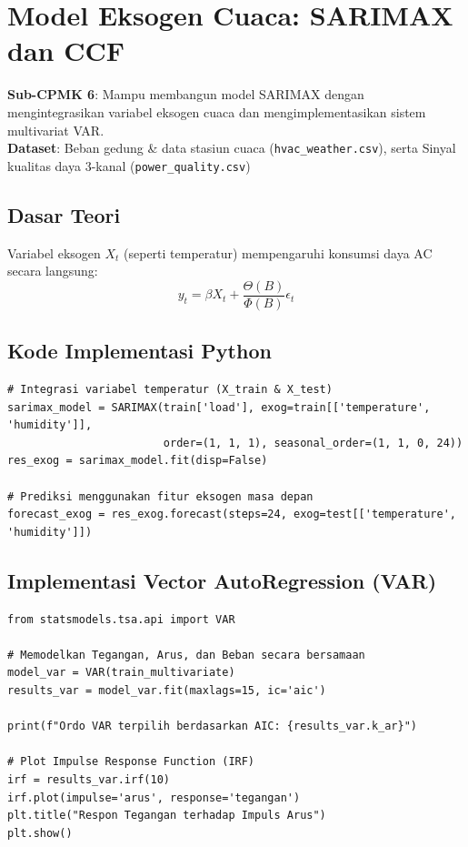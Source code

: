 \documentclass[11pt,a4paper]{report}
\begin{document}
\newpage

\chapter{Model Eksogen Cuaca: SARIMAX dan CCF}

\begin{tcolorbox}[title=Informasi Modul 6]
\textbf{Sub-CPMK 6}: Mampu membangun model SARIMAX dengan mengintegrasikan variabel eksogen cuaca dan mengimplementasikan sistem multivariat VAR.\\
\textbf{Dataset}: Beban gedung \& data stasiun cuaca (\texttt{hvac\_weather.csv}), serta Sinyal kualitas daya 3-kanal (\texttt{power\_quality.csv})
\end{tcolorbox}

\section{Dasar Teori}
Variabel eksogen $X_t$ (seperti temperatur) mempengaruhi konsumsi daya AC secara langsung:
\begin{equation}
    y_t = \beta X_t + \frac{\Theta(B)}{\Phi(B)}\epsilon_t
\end{equation}

\section{Kode Implementasi Python}
\begin{lstlisting}
# Integrasi variabel temperatur (X_train & X_test)
sarimax_model = SARIMAX(train['load'], exog=train[['temperature', 'humidity']],
                        order=(1, 1, 1), seasonal_order=(1, 1, 0, 24))
res_exog = sarimax_model.fit(disp=False)

# Prediksi menggunakan fitur eksogen masa depan
forecast_exog = res_exog.forecast(steps=24, exog=test[['temperature', 'humidity']])
\end{lstlisting}

\section{Implementasi Vector AutoRegression (VAR)}
\begin{lstlisting}
from statsmodels.tsa.api import VAR

# Memodelkan Tegangan, Arus, dan Beban secara bersamaan
model_var = VAR(train_multivariate)
results_var = model_var.fit(maxlags=15, ic='aic')

print(f"Ordo VAR terpilih berdasarkan AIC: {results_var.k_ar}")

# Plot Impulse Response Function (IRF)
irf = results_var.irf(10)
irf.plot(impulse='arus', response='tegangan')
plt.title("Respon Tegangan terhadap Impuls Arus")
plt.show()
\end{lstlisting}
\end{document}
